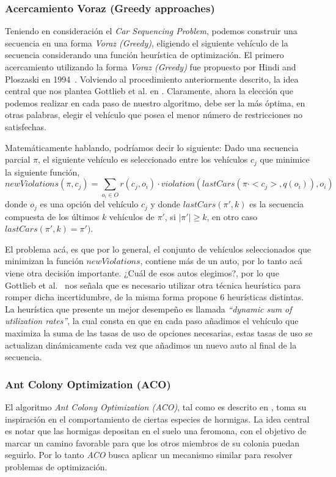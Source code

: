 \subsubsection{Acercamiento Voraz (Greedy approaches)}
Teniendo en consideración el \emph{Car Sequencing Problem}, podemos construir una secuencia
en una forma \emph{Voraz (Greedy)}, eligiendo el siguiente vehículo de la secuencia
considerando una función heurística de optimización.
El primero acercamiento utilizando la forma \emph{Voraz (Greedy)} fue propuesto por
Hindi and Ploszaski en 1994~\cite{HP94}. Volviendo al procedimiento anteriormente descrito, la idea
central que nos plantea Gottlieb et al. en \cite{GPS03}. Claramente, ahora la elección que podemos
realizar en cada paso de nuestro algoritmo, debe ser la más óptima, en otras palabras,
elegir el vehículo que posea el menor número de restricciones no satisfechas.

Matemáticamente hablando, podríamos decir lo siguiente:
Dado una secuencia parcial $\pi$, el siguiente vehículo es seleccionado entre los vehículos $c_j$
que minimice la siguiente función,
$$newViolations(\pi, c_j) = \sum_{o_{i}\in O}r(c_j,o_i)\cdot violation(lastCars(\pi\cdot <c_j>,q(o_i)),o_i)$$
donde $o_j$ es una opción del vehículo $c_j$ y donde $lastCars(\pi',k)$ es la secuencia compuesta de los
últimos $k$ vehículos de $\pi'$, si $|\pi'| \geq k$, en otro caso $lastCars(\pi' , k) = \pi')$.

El problema acá, es que por lo general, el conjunto de vehículos seleccionados que minimizan la función
$newViolations$, contiene más de un auto, por lo tanto acá viene otra decisión importante. ¿Cuál de esos
autos elegimos?, por lo que Gottlieb et al.~\cite{GPS03} nos señala que es necesario utilizar otra técnica heurística para 
romper dicha incertidumbre, de la misma forma propone 6 heurísticas distintas. La heurística que presente
un mejor desempeño es llamada \emph{``dynamic sum of utilization rates''}, la cual consta en que en cada paso
añadimos el vehículo que maximiza la suma de las tasas de uso de opciones necesarias, estas tasas de uso se actualizan
dinámicamente cada vez que añadimos un nuevo auto al final de la secuencia.

\subsubsection{Ant Colony Optimization (ACO)}
El algoritmo \emph{Ant Colony Optimization (ACO)}, tal como es descrito en \cite{DS05},
toma su inspiración en el comportamiento de ciertas especies de hormigas. La idea central
es notar que las hormigas depositan en el suelo una feromona, con el objetivo de marcar
un camino favorable para que los otros miembros de su colonia puedan seguirlo. Por lo tanto
\emph{ACO} busca aplicar un mecanismo similar para resolver problemas de optimización.

